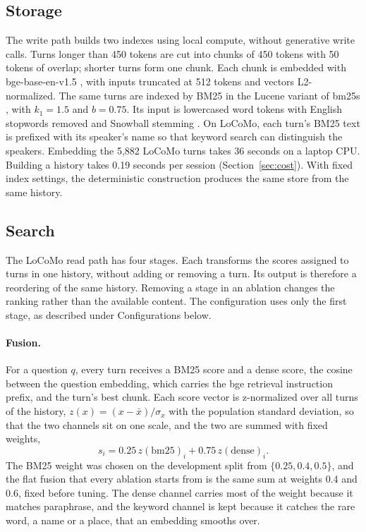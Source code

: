 \subsection{Storage}
The write path builds two indexes using local compute, without generative write calls. Turns longer than 450 tokens are cut into chunks of 450 tokens with 50 tokens of overlap; shorter turns form one chunk. Each chunk is embedded with bge-base-en-v1.5 \citep{xiao2023cpack}, with inputs truncated at 512 tokens and vectors L2-normalized. The same turns are indexed by BM25 \citep{robertson2009bm25} in the Lucene variant of bm25s \citep{lu2024bm25s}, with $k_1 = 1.5$ and $b = 0.75$. Its input is lowercased word tokens with English stopwords removed and Snowball stemming \citep{porter2001snowball}. On LoCoMo, each turn's BM25 text is prefixed with its speaker's name so that keyword search can distinguish the speakers. Embedding the 5,882 LoCoMo turns takes 36 seconds on a laptop CPU. Building a \lmes{} history takes 0.19 seconds per session (Section~\ref{sec:cost}). With fixed index settings, the deterministic construction produces the same store from the same history.

\subsection{Search}
The LoCoMo read path has four stages. Each transforms the scores assigned to turns in one history, without adding or removing a turn. Its output is therefore a reordering of the same history. Removing a stage in an ablation changes the ranking rather than the available content. The \lmes{} configuration uses only the first stage, as described under Configurations below.

\paragraph{Fusion.}
For a question $q$, every turn receives a BM25 score and a dense score, the cosine between the question embedding, which carries the bge retrieval instruction prefix, and the turn's best chunk. Each score vector is z-normalized over all turns of the history, $z(x) = (x - \bar{x}) / \sigma_x$ with the population standard deviation, so that the two channels sit on one scale, and the two are summed with fixed weights,
\begin{equation}
s_i = 0.25\, z(\mathrm{bm25})_i + 0.75\, z(\mathrm{dense})_i .
\label{eq:fuse}
\end{equation}
The BM25 weight was chosen on the development split from $\{0.25, 0.4, 0.5\}$, and the flat fusion that every ablation starts from is the same sum at weights 0.4 and 0.6, fixed before tuning. The dense channel carries most of the weight because it matches paraphrase, and the keyword channel is kept because it catches the rare word, a name or a place, that an embedding smooths over.

